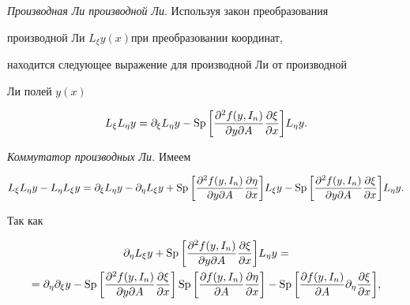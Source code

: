 {\it Производная Ли производной Ли}. Используя закон преобразования


производной Ли $L_\xi y(x)$\quad при преобразовании координат,


находится следующее выражение для производной Ли от производной


Ли полей $ y(x)$


$$


L_\xi L_\eta y=\partial_\xi L_\eta y-\SP


\bigg[ \frac{\partial^2 f(y,I_n)}{\partial y\partial A}


\frac{\partial\xi}{\partial x}\bigg]L_\eta y.


$$





{\it Коммутатор производных Ли.} Имеем


$$


L_\xi L_\eta y-L_\eta L_\xi y=


\partial_\xi L_\eta y-\partial_\eta L_\xi y +\SP


\bigg[ \frac{\partial^2 f(y,I_n)}{\partial y\partial A}


\frac{\partial\eta}{\partial x}\bigg]L_\xi y-


\SP\bigg[ \frac{\partial^2 f(y,I_n)}{\partial y\partial A}


\frac{\partial\xi}{\partial x}\bigg]L_\eta y.


$$


Так как


\begin{multline*}


\partial_\eta L_\xi y+\SP


\bigg[ \frac{\partial^2 f(y,I_n)}{\partial y\partial A}


\frac{\partial\xi}{\partial x}\bigg]L_\eta y= \\


%


=\partial_\eta \partial_\xi y-\SP


\bigg[ \frac{\partial^2 f(y,I_n)}{\partial y\partial A}


\frac{\partial\xi}{\partial x}\bigg]\SP


\bigg[ \frac{\partial f(y,I_n)}{\partial A}


\frac{\partial\eta}{\partial x}\bigg]-\SP


\bigg[ \frac{\partial f(y,I_n)}{\partial A}\partial_\eta


\frac{\partial\xi}{\partial x}\bigg],


\end{multline*}


